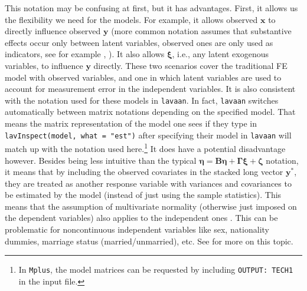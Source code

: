 \documentclass[]{interact}
\theoremstyle{plain}%
\theoremstyle{definition}
\theoremstyle{remark}
\begin{document}
This notation may be confusing at first, but it has advantages. First,
it allows us the flexibility we need for the models. For example, it
allows observed \(\bm{x}\) to directly influence observed \(\bm{y}\)
(more common notation assumes that substantive effects occur only
between latent variables, observed ones are only used as indicators, see
for example \citet{Bollen1989}, \citet{Kline2016}). It also allows
\(\bm{\xi}\), i.e., any latent exogenous variables, to influence
\(\bm{y}\) directly. These two scenarios cover the traditional FE model
with observed variables, and one in which latent variables are used to
account for measurement error in the independent variables. It is also
consistent with the notation used for these models in \texttt{lavaan}.
In fact, \texttt{lavaan} switches automatically between matrix notations
depending on the specified model. That means the matrix representation
of the model one sees if they type in
\texttt{lavInspect(model,\ what\ =\ "est")} after specifying their model
in \texttt{lavaan} will match up with the notation used here.\footnote{In
  \texttt{Mplus}, the model matrices can be requested by including
  \texttt{OUTPUT:\ TECH1} in the input file.} It does have a potential
disadvantage however. Besides being less intuitive than the typical
\(\bm{\eta} = \bm{B}\bm{\eta} + \bm{\Gamma}\bm{\xi} + \bm{\zeta}\)
notation, it means that by including the observed covariates in the
stacked long vector \(\bm{y}^{*}\), they are treated as another response
variable with variances and covariances to be estimated by the model
(instead of just using the sample statistics). This means that the
assumption of multivariate normality (otherwise just imposed on the
dependent variables) also applies to the independent ones
\citep[p.~75]{Skrondal2004}. This can be problematic for noncontinuous
independent variables like sex, nationality dummies, marriage status
(married/unmarried), etc. See \citet{Skrondal2004} for more on this
topic.
\end{document}
